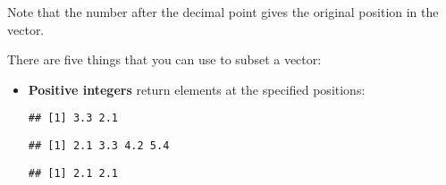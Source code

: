 \begin{Shaded}
\begin{Highlighting}[]
\StringTok{ }\NormalTok{(}\NormalTok{, }\NormalTok{, }\NormalTok{, }\NormalTok{)}
\end{Highlighting}
\end{Shaded}

Note that the number after the decimal point gives the original position
in the vector.

There are five things that you can use to subset a vector:

\begin{itemize}
\item
  \textbf{Positive integers} return elements at the specified positions:

\begin{Shaded}
\begin{Highlighting}[]
\NormalTok{x[}\NormalTok{(}\NormalTok{, }\NormalTok{)]}
\end{Highlighting}
\end{Shaded}

\begin{verbatim}
## [1] 3.3 2.1
\end{verbatim}

\begin{Shaded}
\begin{Highlighting}[]
\NormalTok{x[}\NormalTok{(x)]}
\end{Highlighting}
\end{Shaded}

\begin{verbatim}
## [1] 2.1 3.3 4.2 5.4
\end{verbatim}

\begin{Shaded}
\begin{Highlighting}[]
\NormalTok{x[}\NormalTok{(}\NormalTok{, }\NormalTok{)]}
\end{Highlighting}
\end{Shaded}

\begin{verbatim}
## [1] 2.1 2.1
\end{verbatim}

\begin{Shaded}
\begin{Highlighting}[]
\NormalTok{x[}\NormalTok{(}\NormalTok{, }\NormalTok{)]}
\end{Highlighting}
\end{Shaded}


\end{itemize}
